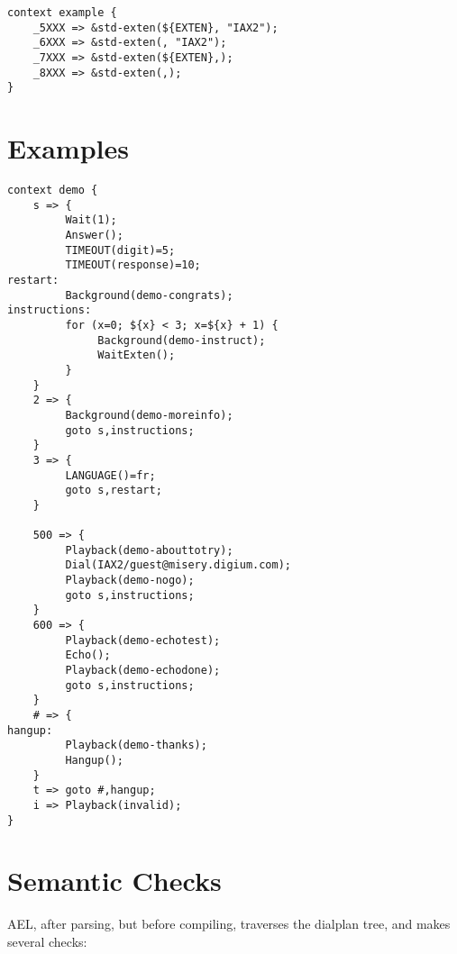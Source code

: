 {\begin{astlisting}
\begin{verbatim}
context example {
    _5XXX => &std-exten(${EXTEN}, "IAX2");
    _6XXX => &std-exten(, "IAX2");
    _7XXX => &std-exten(${EXTEN},);
    _8XXX => &std-exten(,);
}
\end{verbatim}
\end{astlisting}


\section{Examples}

\begin{astlisting}
\begin{verbatim}
context demo {
    s => {
         Wait(1);
         Answer();
         TIMEOUT(digit)=5;
         TIMEOUT(response)=10;
restart:
         Background(demo-congrats);
instructions:
         for (x=0; ${x} < 3; x=${x} + 1) {
              Background(demo-instruct);
              WaitExten();
         }
    }
    2 => {
         Background(demo-moreinfo);
         goto s,instructions;
    }
    3 => {
         LANGUAGE()=fr;
         goto s,restart;
    }

    500 => {
         Playback(demo-abouttotry);
         Dial(IAX2/guest@misery.digium.com);
         Playback(demo-nogo);
         goto s,instructions;
    }
    600 => {
         Playback(demo-echotest);
         Echo();
         Playback(demo-echodone);
         goto s,instructions;
    }
    # => {
hangup:
         Playback(demo-thanks);
         Hangup();
    }
    t => goto #,hangup;
    i => Playback(invalid);
}
\end{verbatim}
\end{astlisting}


\section{Semantic Checks}


AEL, after parsing, but before compiling, traverses the dialplan
tree, and makes several checks:

}
